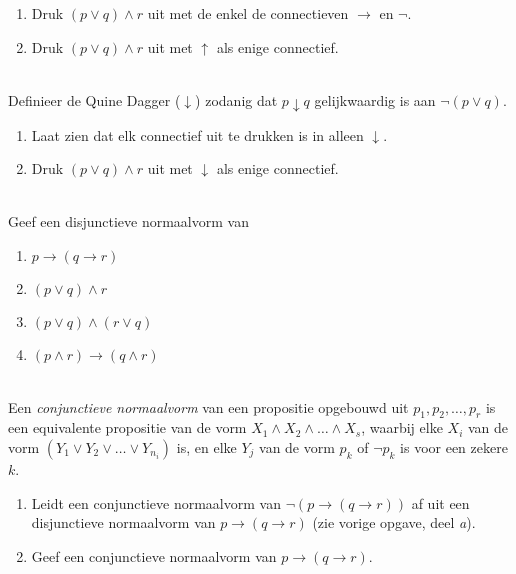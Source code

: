 \begin{exercise}\mbox{}
\begin{enumerate}[label=\textit{\alph*.}]
\item Druk $(p\lor q)\land r$ uit met de enkel de connectieven $\rightarrow$ en $\neg$.
\item Druk $(p\lor q)\land r$ uit met $\uparrow$ als enige connectief.
\end{enumerate}
\end{exercise}

\begin{exercise}\mbox{}\\
Definieer de Quine Dagger ($\downarrow$) zodanig dat $p\downarrow q$ gelijkwaardig is aan $\neg(p\lor q)$.
\begin{enumerate}[label=\textit{\alph*.}]
\item Laat zien dat elk connectief uit te drukken is in alleen $\downarrow$.
\item Druk $(p\lor q)\land r$ uit met $\downarrow$ als enige connectief.
\end{enumerate}
\end{exercise}

\begin{exercise}\mbox{}\\
Geef een disjunctieve normaalvorm van
\begin{enumerate}[label=\textit{\alph*.}]
\item $p\rightarrow(q\rightarrow r)$
\item $(p\lor q)\land r$
\item $(p\lor q)\land(r\lor q)$
\item $(p\land r)\rightarrow(q\land r)$
\end{enumerate}
\end{exercise}

\begin{exercise}[Pittig!]\mbox{}\\
Een \textit{conjunctieve normaalvorm} van een propositie opgebouwd uit $p_1,p_2,\ldots,p_r$ is een equivalente propositie van de vorm $X_1\land X_2\land\ldots\land X_s$, waarbij elke $X_i$ van de vorm $(Y_1\lor Y_2\lor\ldots\lor Y_{n_i})$ is, en elke $Y_j$ van de vorm $p_k$ of $\neg p_k$ is voor een zekere $k$.
\begin{enumerate}[label=\textit{\alph*.}]
\item Leidt een conjunctieve normaalvorm van $\neg(p\rightarrow(q\rightarrow r))$ af uit een disjunctieve normaalvorm van $p\rightarrow(q\rightarrow r)$ (zie vorige opgave, deel \textit{a}).
\item Geef een conjunctieve normaalvorm van $p\rightarrow(q\rightarrow r)$.
\end{enumerate}
\end{exercise}





